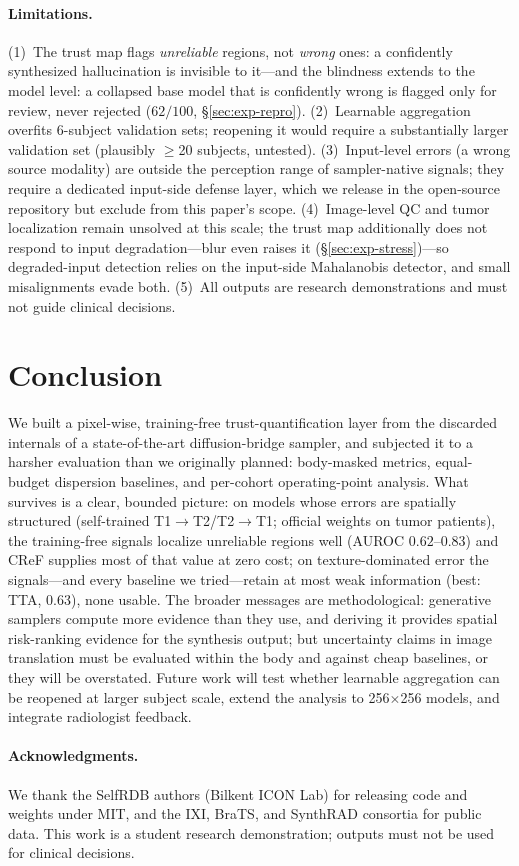 \documentclass[11pt]{article}
\begin{document}
\paragraph{Limitations.}
(1)~The trust map flags \emph{unreliable} regions, not \emph{wrong} ones: a
confidently synthesized hallucination is invisible to it---and the blindness
extends to the model level: a collapsed base model that is confidently wrong
is flagged only for review, never rejected ($62/100$,
\S\ref{sec:exp-repro}).
(2)~Learnable aggregation overfits 6-subject validation sets; reopening it
would require a substantially larger validation set (plausibly $\ge$20
subjects, untested).
(3)~Input-level errors (a wrong source modality) are outside the perception
range of sampler-native signals; they require a dedicated input-side defense
layer, which we release in the open-source repository but exclude from this
paper's scope.
(4)~Image-level QC and tumor localization remain unsolved at this scale; the
trust map additionally does not respond to input degradation---blur even
raises it (\S\ref{sec:exp-stress})---so degraded-input detection relies on
the input-side Mahalanobis detector, and small misalignments evade both.
(5)~All outputs are research demonstrations and must not guide clinical
decisions.

\section{Conclusion}
We built a pixel-wise, training-free trust-quantification layer from the
discarded internals of a state-of-the-art diffusion-bridge sampler, and subjected it to a harsher evaluation than we originally
planned: body-masked metrics, equal-budget dispersion baselines, and
per-cohort operating-point analysis. What survives is a clear, bounded
picture: on models whose errors are spatially structured (self-trained
T1$\to$T2/T2$\to$T1; official weights on tumor patients), the training-free signals localize unreliable
regions well (AUROC $0.62$--$0.83$) and CReF supplies most of that value at
zero cost; on texture-dominated error the signals---and every baseline we
tried---retain at most weak information (best: TTA,
$0.63$), none usable. The broader messages are methodological: generative
samplers compute more evidence than they use, and deriving it provides spatial
risk-ranking evidence for the synthesis output; but uncertainty claims in
image translation must be evaluated within the body and against cheap
baselines, or they will be overstated. Future work will test whether learnable aggregation can be reopened at
larger subject scale, extend the analysis to 256$\times$256 models, and
integrate radiologist feedback.

\paragraph{Acknowledgments.}
We thank the SelfRDB authors (Bilkent ICON Lab) for releasing code and weights
under MIT, and the IXI, BraTS, and SynthRAD consortia for public data. This
work is a student research demonstration; outputs must not be used for
clinical decisions.



\end{document}
